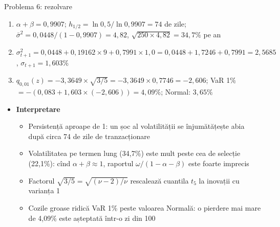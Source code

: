 \begin{frame}{Problema 6: rezolvare}
\itemsize{\footnotesize}
\begin{enumerate}
    \item $\alpha + \beta = 0{,}9907$; $h_{1/2} = \ln 0{,}5/\ln 0{,}9907 = 74$ de zile; $\bar\sigma^2 = 0{,}0448/(1 - 0{,}9907) = 4{,}82$, $\sqrt{250 \times 4{,}82} = 34{,}7\%$ pe an
    \item $\sigma_{t+1}^2 = 0{,}0448 + 0{,}19162 \times 9 + 0{,}7991 \times 1{,}0 = 0{,}0448 + 1{,}7246 + 0{,}7991 = 2{,}5685$, $\sigma_{t+1} = 1{,}603\%$
    \item $q_{0,01}(z) = \ensuremath{-}3{,}3649 \times \sqrt{3/5} = \ensuremath{-}3{,}3649 \times 0{,}7746 = \ensuremath{-}2{,}606$; VaR 1\% $= -(0{,}083 + 1{,}603 \times (\ensuremath{-}2{,}606)) = 4{,}09\%$; Normal: $3{,}65\%$
\end{enumerate}
\begin{itemize}
    \item \textbf{Interpretare}
    \begin{itemize}
        \item Persistență aproape de 1: un șoc al volatilității se înjumătățește abia după circa 74 de zile de tranzacționare
        \item Volatilitatea pe termen lung (34{,}7\%) este mult peste cea de selecție (22{,}1\%): cînd $\alpha + \beta \approx 1$, raportul $\omega/(1 - \alpha - \beta)$ este foarte imprecis
        \item Factorul $\sqrt{3/5} = \sqrt{(\nu - 2)/\nu}$ rescalează cuantila $t_5$ la inovații cu varianța 1
        \item Cozile groase ridică VaR 1\% peste valoarea Normală: o pierdere mai mare de 4{,}09\% este așteptată într-o zi din 100
    \end{itemize}
\end{itemize}
\end{frame}


